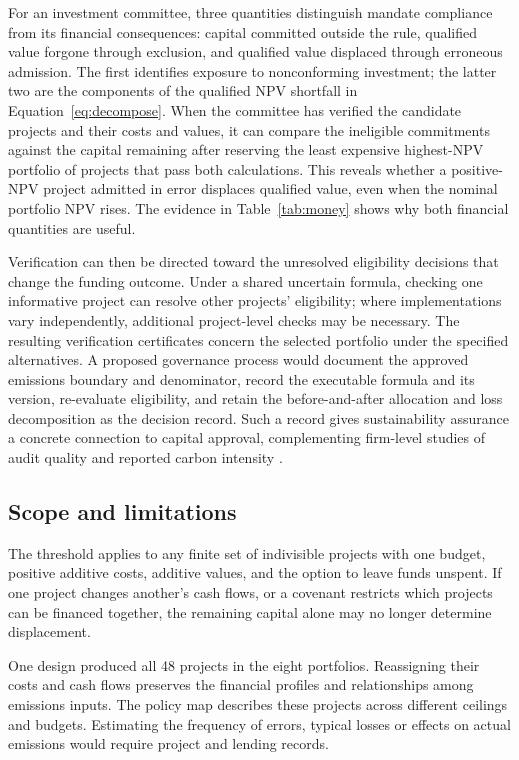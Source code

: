 For an investment committee, three quantities distinguish mandate compliance from its financial consequences: capital committed outside the rule, qualified value forgone through exclusion, and qualified value displaced through erroneous admission. The first identifies exposure to nonconforming investment; the latter two are the components of the qualified NPV shortfall in Equation~\eqref{eq:decompose}. When the committee has verified the candidate projects and their costs and values, it can compare the ineligible commitments against the capital remaining after reserving the least expensive highest-NPV portfolio of projects that pass both calculations. This reveals whether a positive-NPV project admitted in error displaces qualified value, even when the nominal portfolio NPV rises. The evidence in Table~\ref{tab:money} shows why both financial quantities are useful.

Verification can then be directed toward the unresolved eligibility decisions that change the funding outcome. Under a shared uncertain formula, checking one informative project can resolve other projects' eligibility; where implementations vary independently, additional project-level checks may be necessary. The resulting verification certificates concern the selected portfolio under the specified alternatives. A proposed governance process would document the approved emissions boundary and denominator, record the executable formula and its version, re-evaluate eligibility, and retain the before-and-after allocation and loss decomposition as the decision record. Such a record gives sustainability assurance a concrete connection to capital approval, complementing firm-level studies of audit quality and reported carbon intensity \citep{ibrahim2026}.

\subsection{Scope and limitations}
The threshold applies to any finite set of indivisible projects with one budget, positive additive costs, additive values, and the option to leave funds unspent. If one project changes another's cash flows, or a covenant restricts which projects can be financed together, the remaining capital alone may no longer determine displacement.

One design produced all 48 projects in the eight portfolios. Reassigning their costs and cash flows preserves the financial profiles and relationships among emissions inputs. The policy map describes these projects across different ceilings and budgets. Estimating the frequency of errors, typical losses or effects on actual emissions would require project and lending records.

